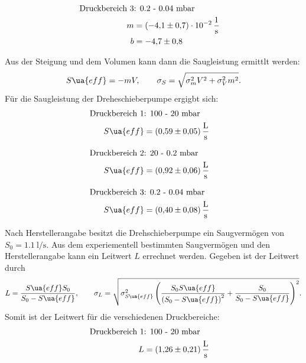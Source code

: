 \begin{align}
  \label{eq: regression_dreh_druck_3}
  \begin{aligned}
  \text{Druckbereich 3} &\text{: 0.2 - 0.04 mbar}& \\
  m&=\SI{-4.1\pm0.7 e-2}{\per\second} \\
  b&=\num{-4.7 \pm0.8 }
\end{aligned}
\end{align}

Aus der Steigung und dem Volumen kann dann die Saugleistung ermittlt werden:
\begin{equation}
  \label{eq: saug_druck}
  S\ua{eff}=-mV, \qquad \sigma_{S}=\sqrt{\sigma_{m}^{2} V^{2} + \sigma_{V}^{2} m^{2}}.
\end{equation}
Für die Saugleistung der Dreheschieberpumpe ergigbt sich:
\begin{align}
  \label{eq:dreh_saug_1}
  \begin{aligned}
  \text{Druckbereich 1} &\text{: 100 - 20 mbar}& \\
   S\ua{eff}&=\SI{0.59\pm 0.05}{\litre\per\second}
\end{aligned}
\end{align}

\begin{align}
  \label{eq:dreh_saug_2}
  \begin{aligned}
  \text{Druckbereich 2} &\text{: 20 - 0.2 mbar}& \\
   S\ua{eff}&=\SI{0.92\pm 0.06}{\litre\per\second}
\end{aligned}
\end{align}

\begin{align}
  \label{eq:dreh_saug_3}
  \begin{aligned}
  \text{Druckbereich 3} &\text{: 0.2 - 0.04 mbar}& \\
   S\ua{eff}&=\SI{0.40\pm 0.08}{\litre\per\second}
\end{aligned}
\end{align}

Nach Herstellerangabe besitzt die Drehschieberpumpe ein Saugvermögen von $S_0=\SI{1.1}{\litre\per\second}$.
Aus dem experiementell bestimmten Saugvermögen und den Herstellerangabe kann ein Leitwert $L$ errechnet werden.
Gegeben ist der Leitwert durch
\begin{equation*}
  L=\frac{S\ua{eff} S_0}{S_0-S\ua{eff}}, \qquad \sigma_L=\sqrt{ \sigma_{S\ua{eff}}^{2} \left(\frac{S_{0} S\ua{eff}}{\left(S_{0} - S\ua{eff}\right)^{2}} + \frac{S_{0}}{S_{0} - S\ua{eff}}\right)^{2}}.
\end{equation*}
Somit ist der Leitwert für die verschiedenen Druckbereiche:
\begin{align}
  \label{eq:dreh_leit_1}
  \begin{aligned}
  \text{Druckbereich 1} &\text{: 100 - 20 mbar}& \\
   L&=\SI{1.26\pm 0.21}{\litre\per\second}
\end{aligned}
\end{align}

